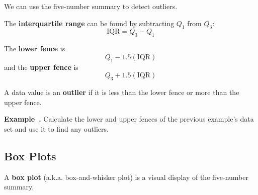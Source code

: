 \documentclass{article}
\newcounter{example}[section]
\newenvironment{example}[1][]{\refstepcounter{example}\par\medskip
   {\color{red}\textbf{Example~\theexample. #1}}}{\medskip}
\begin{document}
We can use the five-number summary to detect outliers.	

\vspace{1in}

\begin{tcolorbox}[colframe=green!20!black, colback = green!30!white,title=\textbf{Interquartile Range}]
The \textbf{interquartile range} can be found by subtracting $Q_1$ from $Q_3$:
\[ \text{IQR} = Q_3 - Q_1 \]
\end{tcolorbox}

\vspace{1in}

The {\color{blue}\textbf{lower fence}} is
\[Q_1 - 1.5(\mathrm{IQR}) \]
and the {\color{blue}\textbf{upper fence} is}
\[Q_3 + 1.5(\mathrm{IQR}) \]

\vspace{0.5in}

A data value is an {\color{red}\textbf{outlier}} if it is less than the lower fence or more than the upper fence.

\vspace{2in}

\begin{example}
Calculate the lower and upper fences of the previous example's data set and use it to find any outliers.
\end{example}

\newpage


\subsection*{Box Plots}

\begin{tcolorbox}[colframe=green!20!black, colback = green!30!white,title=\textbf{Boxplot}]
A \textbf{box plot} (a.k.a. box-and-whisker plot) is a visual display of the five-number summary. 
\end{tcolorbox}
\vspace{8pt}	
\begin{center}
\end{center}
\end{document}
